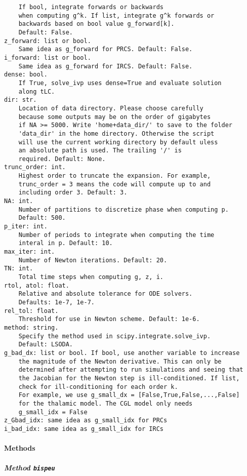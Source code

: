 \documentclass[english,a4paper,oneside]{article}
\let\oldparagraph\paragraph
\renewcommand{\paragraph}[1]{\oldparagraph{#1}\mbox{}}
\let\oldsubparagraph\subparagraph
\renewcommand{\subparagraph}[1]{\oldsubparagraph{#1}\mbox{}}
\begin{document}
\begin{verbatim}
    If bool, integrate forwards or backwards
    when computing g^k. If list, integrate g^k forwards or
    backwards based on bool value g_forward[k].
    Default: False.
z_forward: list or bool.
    Same idea as g_forward for PRCS. Default: False.
i_forward: list or bool.
    Same idea as g_forward for IRCS. Default: False.
dense: bool.
    If True, solve_ivp uses dense=True and evaluate solution
    along tLC.
dir: str.
    Location of data directory. Please choose carefully
    because some outputs may be on the order of gigabytes
    if NA >= 5000. Write 'home+data_dir/' to save to the folder
    'data_dir' in the home directory. Otherwise the script
    will use the current working directory by default uless
    an absolute path is used. The trailing '/' is
    required. Default: None.
trunc_order: int.
    Highest order to truncate the expansion. For example, 
    trunc_order = 3 means the code will compute up to and 
    including order 3. Default: 3.
NA: int.
    Number of partitions to discretize phase when computing p.
    Default: 500.
p_iter: int.
    Number of periods to integrate when computing the time 
    interal in p. Default: 10.
max_iter: int.
    Number of Newton iterations. Default: 20.
TN: int.
    Total time steps when computing g, z, i.
rtol, atol: float.
    Relative and absolute tolerance for ODE solvers.
    Defaults: 1e-7, 1e-7.
rel_tol: float.
    Threshold for use in Newton scheme. Default: 1e-6.
method: string.
    Specify the method used in scipy.integrate.solve_ivp.
    Default: LSODA.
g_bad_dx: list or bool. If bool, use another variable to increase
    the magnitude of the Newton derivative. This can only be
    determined after attempting to run simulations and seeing that
    the Jacobian for the Newton step is ill-conditioned. If list,
    check for ill-conditioning for each order k.
    For example, we use g_small_dx = [False,True,False,...,False]
    for the thalamic model. The CGL model only needs
    g_small_idx = False
z_Gbad_idx: same idea as g_small_idx for PRCs
i_bad_idx: same idea as g_small_idx for IRCs
\end{verbatim}

\hypertarget{methods}{%
\paragraph{Methods}\label{methods}}

\hypertarget{StrongCoupling.StrongCoupling.bispeu}{%
\subparagraph{\texorpdfstring{Method
\texttt{bispeu}}{Method bispeu}}\label{StrongCoupling.StrongCoupling.bispeu}}
\end{document}
